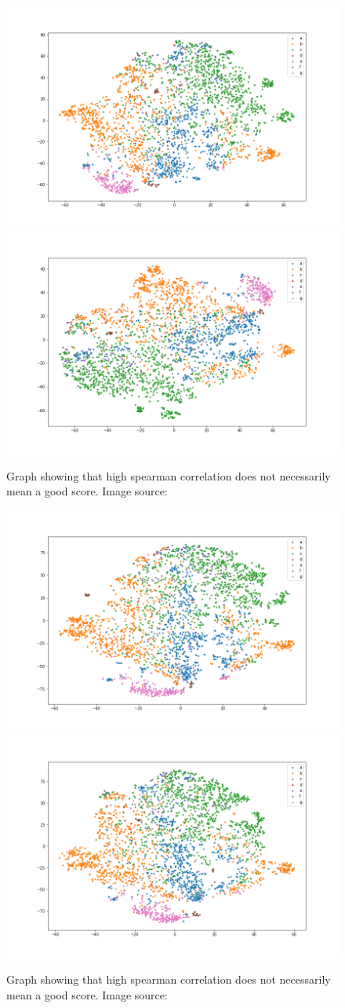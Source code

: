 \begin{figure}[!ht]
  \centering
  \includegraphics[width=0.4\linewidth]{latex/imgs/tsne_1_layer_with_schedule_512_final.png}
  \includegraphics[width=0.4\linewidth]{latex/imgs/tsne_1_layer_with_schedule_512_minloss.png}
  \caption{Graph showing that high spearman correlation does not necessarily mean a good score. Image source:\cite{spearman}}
\end{figure}
\begin{figure}[!ht]
  \centering
  \includegraphics[width=0.4\linewidth]{latex/imgs/tsne_1_layer_with_schedule_256_final.png}
  \includegraphics[width=0.4\linewidth]{latex/imgs/tsne_1_layer_with_schedule_256_minloss.png}
  \caption{Graph showing that high spearman correlation does not necessarily mean a good score. Image source:\cite{spearman}}
\end{figure}
